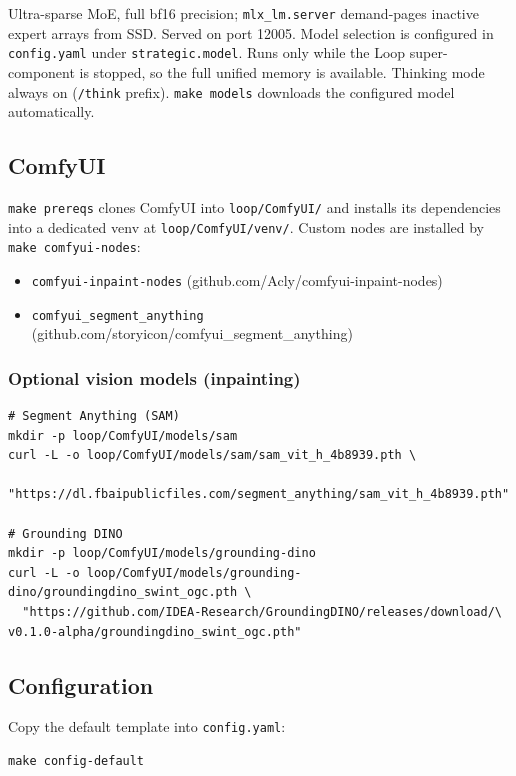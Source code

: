 \documentclass[11pt,letterpaper]{article}
\begin{document}
Ultra-sparse MoE, full bf16 precision; \texttt{mlx\_lm.server} demand-pages
inactive expert arrays from SSD. Served on port 12005. Model selection is
configured in \texttt{config.yaml} under \texttt{strategic.model}. Runs only
while the Loop super-component is stopped, so the full unified memory is
available. Thinking mode always on (\texttt{/think} prefix). \texttt{make
models} downloads the configured model automatically.

\subsection{ComfyUI}

\texttt{make prereqs} clones ComfyUI into \texttt{loop/ComfyUI/} and
installs its dependencies into a dedicated venv at
\texttt{loop/ComfyUI/venv/}. Custom nodes are installed by
\texttt{make comfyui-nodes}:

\begin{itemize}
  \item \texttt{comfyui-inpaint-nodes} (github.com/Acly/comfyui-inpaint-nodes)
  \item \texttt{comfyui\_segment\_anything} (github.com/storyicon/comfyui\_segment\_anything)
\end{itemize}

\subsubsection{Optional vision models (inpainting)}

\begin{lstlisting}[style=shell]
# Segment Anything (SAM)
mkdir -p loop/ComfyUI/models/sam
curl -L -o loop/ComfyUI/models/sam/sam_vit_h_4b8939.pth \
  "https://dl.fbaipublicfiles.com/segment_anything/sam_vit_h_4b8939.pth"

# Grounding DINO
mkdir -p loop/ComfyUI/models/grounding-dino
curl -L -o loop/ComfyUI/models/grounding-dino/groundingdino_swint_ogc.pth \
  "https://github.com/IDEA-Research/GroundingDINO/releases/download/\
v0.1.0-alpha/groundingdino_swint_ogc.pth"
\end{lstlisting}

\subsection{Configuration}

Copy the default template into \texttt{config.yaml}:

\begin{lstlisting}[style=shell]
make config-default
\end{lstlisting}
\end{document}
